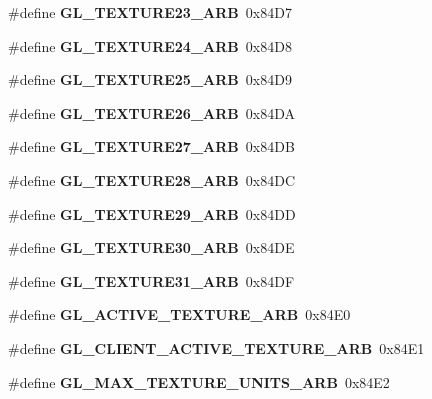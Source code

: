 \begin{DoxyCompactItemize}
\item 
\#define {\bfseries G\+L\+\_\+\+T\+E\+X\+T\+U\+R\+E23\+\_\+\+A\+R\+B}~0x84\+D7\label{_s_d_l__opengl_8h_a2939ad95f95329f1864350f7f6f671ae}

\item 
\#define {\bfseries G\+L\+\_\+\+T\+E\+X\+T\+U\+R\+E24\+\_\+\+A\+R\+B}~0x84\+D8\label{_s_d_l__opengl_8h_a35a9bfe5b9159b6acf132c2443037b8e}

\item 
\#define {\bfseries G\+L\+\_\+\+T\+E\+X\+T\+U\+R\+E25\+\_\+\+A\+R\+B}~0x84\+D9\label{_s_d_l__opengl_8h_a3f2b8c9b9b107ace1cdef8f7982f99c0}

\item 
\#define {\bfseries G\+L\+\_\+\+T\+E\+X\+T\+U\+R\+E26\+\_\+\+A\+R\+B}~0x84\+D\+A\label{_s_d_l__opengl_8h_a4e7e2342e0ef23951d29ff5bb7a27559}

\item 
\#define {\bfseries G\+L\+\_\+\+T\+E\+X\+T\+U\+R\+E27\+\_\+\+A\+R\+B}~0x84\+D\+B\label{_s_d_l__opengl_8h_aea7c294abd4ba4cb46912fcd0f609b7e}

\item 
\#define {\bfseries G\+L\+\_\+\+T\+E\+X\+T\+U\+R\+E28\+\_\+\+A\+R\+B}~0x84\+D\+C\label{_s_d_l__opengl_8h_a6de7d27243b3d0fdd4a359928369e0e5}

\item 
\#define {\bfseries G\+L\+\_\+\+T\+E\+X\+T\+U\+R\+E29\+\_\+\+A\+R\+B}~0x84\+D\+D\label{_s_d_l__opengl_8h_a3a192b61218c6778fa93d6972e8f831a}

\item 
\#define {\bfseries G\+L\+\_\+\+T\+E\+X\+T\+U\+R\+E30\+\_\+\+A\+R\+B}~0x84\+D\+E\label{_s_d_l__opengl_8h_ab36202e145b2813b5f19155a21182e44}

\item 
\#define {\bfseries G\+L\+\_\+\+T\+E\+X\+T\+U\+R\+E31\+\_\+\+A\+R\+B}~0x84\+D\+F\label{_s_d_l__opengl_8h_a6c79418aa7cfc73ac32ab90bc32dd780}

\item 
\#define {\bfseries G\+L\+\_\+\+A\+C\+T\+I\+V\+E\+\_\+\+T\+E\+X\+T\+U\+R\+E\+\_\+\+A\+R\+B}~0x84\+E0\label{_s_d_l__opengl_8h_a3d1cdb2bb788ad14678c573385317e57}

\item 
\#define {\bfseries G\+L\+\_\+\+C\+L\+I\+E\+N\+T\+\_\+\+A\+C\+T\+I\+V\+E\+\_\+\+T\+E\+X\+T\+U\+R\+E\+\_\+\+A\+R\+B}~0x84\+E1\label{_s_d_l__opengl_8h_a41f5906c588989322740f2ca87a35c1d}

\item 
\#define {\bfseries G\+L\+\_\+\+M\+A\+X\+\_\+\+T\+E\+X\+T\+U\+R\+E\+\_\+\+U\+N\+I\+T\+S\+\_\+\+A\+R\+B}~0x84\+E2\label{_s_d_l__opengl_8h_a3f8c72ef43026b3f2cd7eec99f1111d7}


\end{DoxyCompactItemize}
